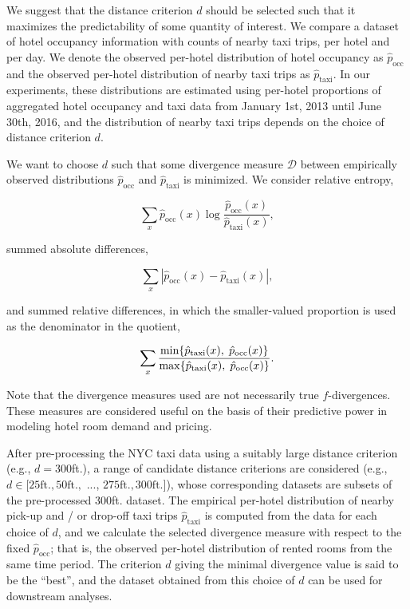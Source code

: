\documentclass[useAMS, usenatbib]{biom}
\begin{document}
We suggest that the distance criterion $d$ should be selected such that it maximizes the predictability of some quantity of interest. We compare a dataset of hotel occupancy information with counts of nearby taxi trips, per hotel and per day. We denote the observed per-hotel distribution of hotel occupancy as $\hat{p}_{\mathrm{occ}}$ and the observed per-hotel distribution of nearby taxi trips as $\hat{p}_{\mathrm{taxi}}$. In our experiments, these distributions are estimated using per-hotel proportions of aggregated hotel occupancy and taxi data from January 1st, 2013 until June 30th, 2016, and the distribution of nearby taxi trips depends on the choice of distance criterion $d$.

We want to choose $d$ such that some divergence measure $\mathcal{D}$ between empirically observed distributions $\hat{p}_{\mathrm{occ}}$ and $\hat{p}_{\mathrm{taxi}}$ is minimized. We consider relative entropy,

$$\sum_x \hat{p}_{\mathrm{occ}} (x) \log \frac{\hat{p}_{\mathrm{occ}} (x)}{\hat{p}_{\mathrm{taxi}} (x)},$$

summed absolute differences,

$$\sum_x | \hat{p}_{\mathrm{occ}} (x) - \hat{p}_{\mathrm{taxi}} (x) |,$$

and summed relative differences, in which the smaller-valued proportion is used as the denominator in the quotient,

$$\sum_x \frac{\min \{ \hat{p}_{\mathrm{taxi}} (x), \hspace*{0.1cm} \hat{p}_{\mathrm{occ}} (x) \}}{\max \{ \hat{p}_{\mathrm{taxi}} (x), \hspace*{0.1cm} \hat{p}_{\mathrm{occ}} (x) \}}.$$

Note that the divergence measures used are not necessarily true $f$-divergences. These measures are considered useful on the basis of their predictive power in modeling hotel room demand and pricing.

After pre-processing the NYC taxi data using a suitably large distance criterion (e.g., $d = 300$ft.), a range of candidate distance criterions are considered (e.g., $d \in [25 \mathrm{ft.}, 50 \mathrm{ft.},$ ..., $275 \mathrm{ft.}, 300 \mathrm{ft.}]$), whose corresponding datasets are subsets of the pre-processed 300ft. dataset. The empirical per-hotel distribution of nearby pick-up and / or drop-off taxi trips $\hat{p}_{\mathrm{taxi}}$ is computed from the data for each choice of $d$, and we calculate the selected divergence measure with respect to the fixed $\hat{p}_{\mathrm{occ}}$; that is, the observed per-hotel distribution of rented rooms from the same time period. The criterion $d$ giving the minimal divergence value is said to be the ``best'', and the dataset obtained from this choice of $d$ can be used for downstream analyses.
\end{document}
